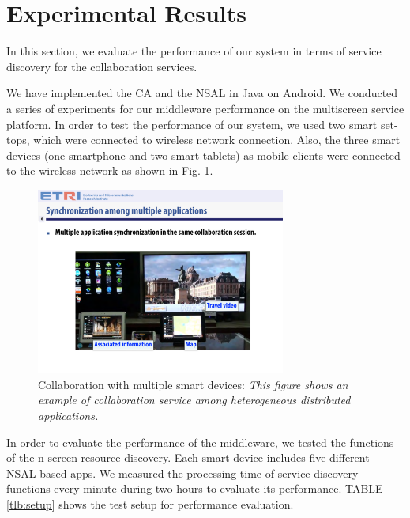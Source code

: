 \documentclass[conference]{IEEEtran}
\begin{document}
%
\section{Experimental Results}
\label{sc:Experiments}
In this section, we evaluate the performance of our system in terms of service discovery for the collaboration services. 

We have implemented the CA and the NSAL in Java on Android. 
We conducted a series of experiments for our middleware performance  on the multiscreen service platform. 
In order to test the performance of our system, we used two smart set-tops, 
which were connected to wireless network connection. Also, the three smart devices (one smartphone and two smart tablets) as mobile-clients 
were connected to the wireless network as shown in Fig. \ref{fig:multiplecollaboration}. 
    \begin{figure}[htb] %
    \centering
    \includegraphics[width=8.2cm,keepaspectratio]{multiplecollaboration_2}
    \caption{Collaboration with multiple smart devices: \emph{This figure shows an example of collaboration service among heterogeneous distributed applications.}}
    \label{fig:multiplecollaboration}
    \end{figure}

In order to evaluate the performance of the middleware, we tested the functions of the n-screen resource discovery. Each
smart device includes five different NSAL-based apps. We measured the processing time of service discovery functions every minute during two hours to evaluate its performance. TABLE \ref{tlb:setup} shows the test setup for performance evaluation.
\end{document}
